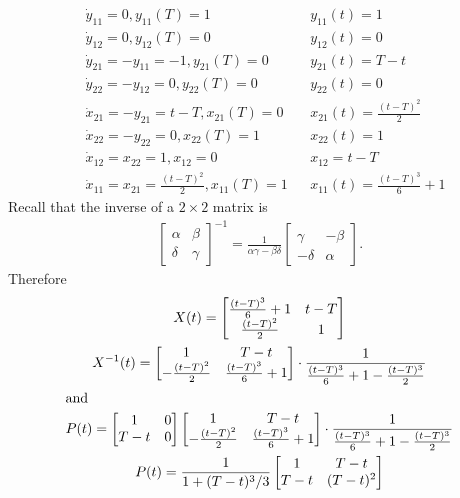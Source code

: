 \begin{align}
  & \dot y_{11} = 0,y_{11}(T)=1 && y_{11}(t) = 1 \\
  & \dot y_{12} = 0,y_{12}(T)=0 && y_{12}(t) = 0 \\
  & \dot y_{21} = -y_{11}=-1,y_{21}(T)=0 && y_{21}(t) = T-t \\
  & \dot y_{22} = -y_{12}=0,y_{22}(T)=0 && y_{22}(t) = 0 \\
  & \dot x_{21} = -y_{21} = t-T,x_{21}(T)=0 && x_{21}(t)=\frac{(t-T)^2}{2} \\
  & \dot x_{22} = -y_{22} = 0,x_{22}(T)=1 && x_{22}(t)=1 \\
  & \dot x_{12} = x_{22} = 1,x_{12}=0 && x_{12} = t-T \\
  & \dot x_{11} = x_{21} = \frac{(t-T)^2}{2},x_{11}(T)=1 && x_{11}(t)=\frac{(t-T)^3}{6}+1
\end{align}
Recall that the inverse of a $2\times2$ matrix is
\begin{gather}
  \begin{bmatrix}
    \alpha & \beta \\ \delta & \gamma
  \end{bmatrix}^{-1}
  = \frac{1}{\alpha\gamma-\beta\delta} \begin{bmatrix}
    \gamma & -\beta \\ -\delta & \alpha
  \end{bmatrix}.
\end{gather}
Therefore
\begin{gather}
  X(t) = \begin{bmatrix}
    \frac{(t-T)^3}{6}+1 & t-T \\
    \frac{(t-T)^2}{2} & 1
  \end{bmatrix} \\
  X^{-1}(t) = \begin{bmatrix}
    1 & T-t \\
    -\frac{(t-T)^2}{2} & \frac{(t-T)^3}{6}+1
  \end{bmatrix} \cdot
  \frac{1}{\frac{(t-T)^3}{6}+1-\frac{(t-T)^3}{2}} \\
  \shortintertext{and}
  P(t) = \begin{bmatrix}
    1 & 0 \\ T-t & 0
  \end{bmatrix}
  \begin{bmatrix}
    1 & T-t \\
    -\frac{(t-T)^2}{2} & \frac{(t-T)^3}{6}+1
  \end{bmatrix} \cdot
  \frac{1}{\frac{(t-T)^3}{6}+1-\frac{(t-T)^3}{2}} \\
  P(t) = \frac{1}{1+(T-t)^3/3} \begin{bmatrix}
    1 & T-t \\ T-t & (T-t)^2
  \end{bmatrix}
\end{gather}
